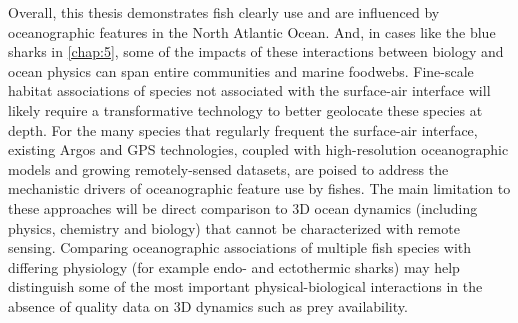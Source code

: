 Overall, this thesis demonstrates fish clearly use and are influenced by oceanographic features in the North Atlantic Ocean. And, in cases like the blue sharks in \cref{chap:5}, some of the impacts of these interactions between biology and ocean physics can span entire communities and marine foodwebs. Fine-scale habitat associations of species not associated with the surface-air interface will likely require a transformative technology to better geolocate these species at depth. For the many species that regularly frequent the surface-air interface, existing Argos and GPS technologies, coupled with high-resolution oceanographic models and growing remotely-sensed datasets, are poised to address the mechanistic drivers of oceanographic feature use by fishes. The main limitation to these approaches will be direct comparison to 3D ocean dynamics (including physics, chemistry and biology) that cannot be characterized with remote sensing. Comparing oceanographic associations of multiple fish species with differing physiology (for example endo- and ectothermic sharks) may help distinguish some of the most important physical-biological interactions in the absence of quality data on 3D dynamics such as prey availability.


